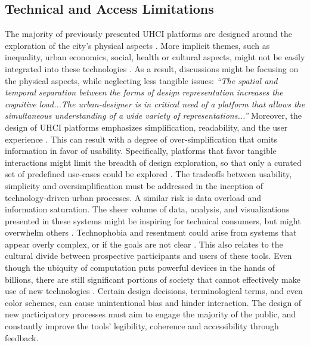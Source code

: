 {{      \subsection{Technical and Access Limitations}
      {
          The majority of previously presented UHCI platforms are designed around the exploration of the city's physical aspects \cite{ben-joseph2001}. More implicit themes, such as inequality, urban economics, social, health or cultural aspects, might not be easily integrated into these technologies \cite{Snyder2003}. As a result, discussions might be focusing on the physical aspects, while neglecting less tangible issues: \textit{``The spatial and temporal separation between the forms of design representation increases the cognitive load...The urban-designer is in critical need of a platform that allows the simultaneous understanding of a wide variety of representations...''} \cite{ben-joseph2001}
          Moreover, the design of UHCI platforms emphasizes simplification, readability, and the user experience \cite{Ishii2008}. This can result with a degree of over-simplification that omits information in favor of usability. Specifically, platforms that favor tangible interactions might limit the breadth of design exploration, so that only a curated set of predefined use-cases could be explored \cite{mahyar2016ud}. The tradeoffs between usability, simplicity and oversimplification must be addressed in the inception of technology-driven urban processes.
          \newline
          A similar risk is data overload and information saturation. The sheer volume of data, analysis, and visualizations presented in these systems might be inspiring for technical consumers, but might overwhelm others \cite{Snyder2003}. Technophobia and resentment could arise from systems that appear overly complex, or if the goals are not clear \cite{innes2010planning}. This also relates to the cultural divide between prospective participants and users of these tools. Even though the ubiquity of computation puts powerful devices in the hands of billions, there are still significant portions of society that cannot effectively make use of new technologies \cite{Innes2016, brusaporci2017importance}. Certain design decisions, terminological terms, and even color schemes, can cause unintentional bias and hinder interaction. The design of new participatory processes must aim to engage the majority of the public, and constantly improve the tools' legibility, coherence and accessibility through feedback.
      }

}}
